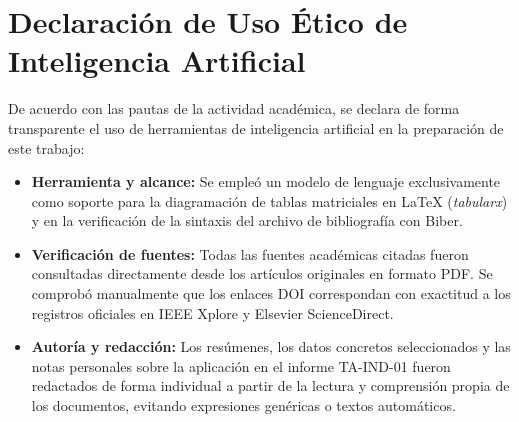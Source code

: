 \documentclass[11pt,a4paper]{article}
\begin{document}
\newpage

\section{Declaración de Uso Ético de Inteligencia Artificial}

De acuerdo con las pautas de la actividad académica, se declara de forma transparente el uso de herramientas de inteligencia artificial en la preparación de este trabajo:

\begin{itemize}[leftmargin=1.3em]
    \item \textbf{Herramienta y alcance:} Se empleó un modelo de lenguaje exclusivamente como soporte para la diagramación de tablas matriciales en LaTeX (\emph{tabularx}) y en la verificación de la sintaxis del archivo de bibliografía con Biber.
    \item \textbf{Verificación de fuentes:} Todas las fuentes académicas citadas fueron consultadas directamente desde los artículos originales en formato PDF. Se comprobó manualmente que los enlaces DOI correspondan con exactitud a los registros oficiales en IEEE Xplore y Elsevier ScienceDirect.
    \item \textbf{Autoría y redacción:} Los resúmenes, los datos concretos seleccionados y las notas personales sobre la aplicación en el informe TA-IND-01 fueron redactados de forma individual a partir de la lectura y comprensión propia de los documentos, evitando expresiones genéricas o textos automáticos.
\end{itemize}

\vspace{1.2em}

\printbibliography[title={Referencias Bibliográficas (Formato IEEE)}]
\end{document}
